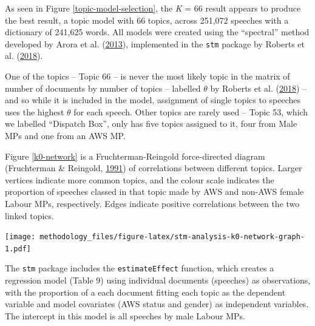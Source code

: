 \documentclass[]{article}
\let\origfigure\figure
\let\endorigfigure\endfigure
\renewenvironment{figure}[1][2] {
    \expandafter\origfigure\expandafter[H]
} {
    \endorigfigure
}
\theoremstyle{definition}
\theoremstyle{definition}
\theoremstyle{definition}
\theoremstyle{remark}
\begin{document}
\begin{table}[H]
\begin{table}[H]
\begin{table}[H]
\begin{table}[H]
\begin{table}[H]
\begin{table}[H]
\begin{table}[H]
\begin{table}[H]
\begin{figure}
\begin{longtabu}
As seen in Figure \ref{topic-model-selection}, the \emph{K} = 66 result
appears to produce the best result, a topic model with 66 topics, across
251,072 speeches with a dictionary of 241,625 words. All models were
created using the ``spectral'' method developed by Arora et al.
(\protect\hyperlink{ref-arora2013}{2013}), implemented in the
\texttt{stm} package by Roberts et al.
(\protect\hyperlink{ref-roberts2018}{2018}).

One of the topics -- Topic 66 -- is never the most likely topic in the
matrix of number of documents by number of topics -- labelled \(\theta\)
by Roberts et al. (\protect\hyperlink{ref-roberts2018}{2018}) -- and so
while it is included in the model, assignment of single topics to
speeches uses the highest \(\theta\) for each speech. Other topics are
rarely used -- Topic 53, which we labelled ``Dispatch Box'', only has
five topics assigned to it, four from Male MPs and one from an AWS MP.

Figure \ref{k0-network} is a Fruchterman-Reingold force-directed diagram
(Fruchterman \& Reingold, \protect\hyperlink{ref-fruchterman1991}{1991})
of correlations between different topics. Larger vertices indicate more
common topics, and the colour scale indicates the proportion of speeches
classed in that topic made by AWS and non-AWS female Labour MPs,
respectively. Edges indicate positive correlations between the two
linked topics.

\begin{figure}
\centering
\texttt{[image: methodology\_files/figure-latex/stm-analysis-k0-network-graph-1.pdf]}
\caption{\label{k0-network}Fruchterman-Reingold plot of Topic Network}
\end{figure}

The \texttt{stm} package includes the \texttt{estimateEffect} function,
which creates a regression model (Table 9) using individual documents
(speeches) as observations, with the proportion of a each document
fitting each topic as the dependent variable and model covariates (AWS
status and gender) as independent variables. The intercept in this model
is all speeches by male Labour MPs.


\end{longtabu}
\end{figure}
\end{table}
\end{table}
\end{table}
\end{table}
\end{table}
\end{table}
\end{table}
\end{table}
\end{document}

